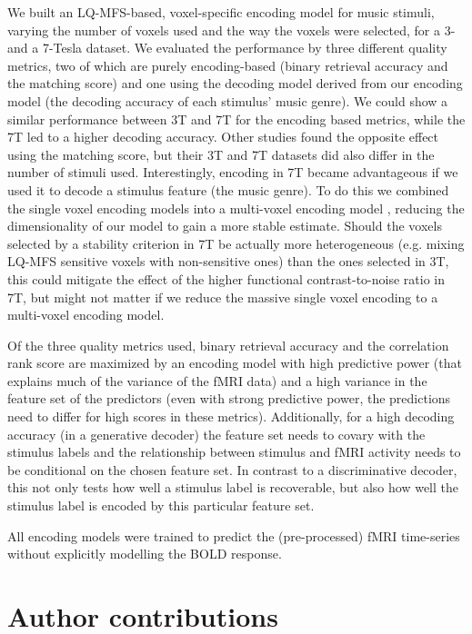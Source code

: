 We built an LQ-MFS-based, voxel-specific encoding model
for music stimuli, varying the number of voxels used and the way the voxels were
selected, for a 3- and a 7-Tesla dataset. We evaluated the performance by three
different quality metrics, two of which are purely encoding-based (binary
retrieval accuracy and the matching score) and one using the decoding model
derived from our encoding model (the decoding accuracy of each stimulus' music genre). We could show a similar
performance between 3T and 7T for the encoding based metrics, while the 7T led
to a higher decoding accuracy. Other studies \citep[e.g.,][]{SF14} found the opposite
effect using the matching score, but their 3T and 7T datasets did also differ
in the number of stimuli used. Interestingly, encoding in 7T became
advantageous if we used it to decode a stimulus feature (the music genre). To
do this we combined the single voxel encoding models into a multi-voxel encoding
model \citep[see][]{NG09}, reducing the dimensionality of our model to gain a
more stable estimate. Should the voxels selected by a stability criterion in 7T
be actually more heterogeneous (e.g. mixing LQ-MFS sensitive voxels with
non-sensitive ones) than the ones selected in 3T, this could mitigate the
effect of the higher functional contrast-to-noise ratio in 7T, but might not
matter if we reduce the massive single voxel encoding to a multi-voxel encoding
model.

Of the three quality metrics used, binary retrieval accuracy and the
correlation rank score are maximized by an encoding model with high predictive
power (that explains much of the variance of the f{MRI} data) and a high
variance in the feature set of the predictors (even with strong predictive
power, the predictions need to differ for high scores in these metrics).
Additionally, for a high decoding accuracy (in a generative decoder) the
feature set needs to covary with the stimulus labels and the relationship
between stimulus and f{MRI} activity needs to be conditional on the chosen
feature set. In contrast to a discriminative decoder, this not only tests how
well a stimulus label is recoverable, but also how well the stimulus label is
encoded by this particular feature set.

All encoding models were trained to predict the (pre-processed) f{MRI}
time-series without explicitly modelling the BOLD response.


\section*{Author contributions}

